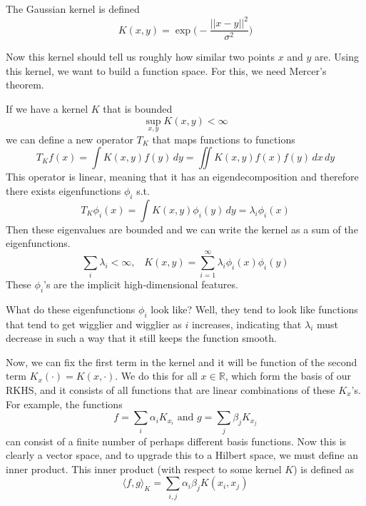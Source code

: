   \begin{example}
    The Gaussian kernel is defined 
    \begin{equation}
      K(x, y) = \exp \bigg( - \frac{||x - y||^2}{\sigma^2} \bigg)
    \end{equation}
  \end{example} 

  Now this kernel should tell us roughly how similar two points $x$ and $y$ are. Using this kernel, we want to build a function space. For this, we need Mercer's theorem. 

  \begin{theorem}
    If we have a kernel $K$ that is bounded 
    \begin{equation}
      \sup_{x, y} K(x, y) < \infty
    \end{equation}
    we can define a new operator $T_K$ that maps functions to functions
    \begin{equation}
      T_K f(x) =  \int K(x, y) f(y) \,dy = \iint K(x, y) f(x) f(y) \,dx\,dy
    \end{equation}
    This operator is linear, meaning that it has an eigendecomposition and therefore there exists eigenfunctions $\phi_i$ s.t. 
    \begin{equation}
      T_K \phi_i (x) = \int K(x, y) \phi_i(y) \,dy = \lambda_i \phi_i(x)
    \end{equation}
    Then these eigenvalues are bounded and we can write the kernel as a sum of the eigenfunctions. 
    \begin{equation}
      \sum_i \lambda_i < \infty, \;\;\; K(x, y) = \sum_{i=1}^\infty \lambda_i \phi_i(x) \phi_i(y)
    \end{equation}
    These $\phi_i$'s are the implicit high-dimensional features. 
  \end{theorem}

  What do these eigenfunctions $\phi_i$ look like? Well, they tend to look like functions that tend to get wigglier and wigglier as $i$ increases, indicating that $\lambda_i$ must decrease in such a way that it still keeps the function smooth. 

  Now, we can fix the first term in the kernel and it will be function of the second term $K_x (\cdot) = K(x, \cdot)$. We do this for all $x \in \mathbb{R}$, which form the basis of our RKHS, and it consists of all functions that are linear combinations of these $K_x$'s. For example, the functions 
  \begin{equation}
    f = \sum_i \alpha_i K_{x_i} \text{ and } g = \sum_j \beta_j K_{x_j} 
  \end{equation}
  can consist of a finite number of perhaps different basis functions. Now this is clearly a vector space, and to upgrade this to a Hilbert space, we must define an inner product. This inner product (with respect to some kernel $K$) is defined as 
  \begin{equation}
    \langle f, g \rangle_K = \sum_{i, j} \alpha_i \beta_j K(x_i, x_j)
  \end{equation}

